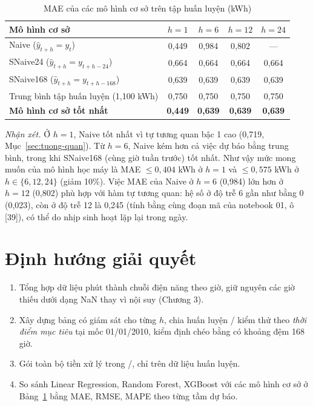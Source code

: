 \documentclass[../main.tex]{subfiles}
\begin{document}
\begin{table}[H]
\centering
\caption{MAE của các mô hình cơ sở trên tập huấn luyện (kWh)}
\label{tab:baseline}
\begin{tabular}{|>{\raggedright\arraybackslash}p{6.2cm}|c|c|c|c|}
\hline
\textbf{Mô hình cơ sở} & $h=1$ & $h=6$ & $h=12$ & $h=24$ \\
\hline
Naive ($\hat{y}_{t+h} = y_t$) & 0,449 & 0,984 & 0,802 & --- \\
\hline
SNaive24 ($\hat{y}_{t+h} = y_{t+h-24}$) & 0,664 & 0,664 & 0,664 & 0,664 \\
\hline
SNaive168 ($\hat{y}_{t+h} = y_{t+h-168}$) & 0,639 & 0,639 & 0,639 & 0,639 \\
\hline
Trung bình tập huấn luyện (1,100 kWh) & 0,750 & 0,750 & 0,750 & 0,750 \\
\hline
\textbf{Mô hình cơ sở tốt nhất} & \textbf{0,449} & \textbf{0,639} & \textbf{0,639} & \textbf{0,639} \\
\hline
\end{tabular}
\end{table}

\noindent\textit{Nhận xét.} Ở $h = 1$, Naive tốt nhất vì tự tương quan bậc 1 cao (0,719, Mục~\ref{sec:tuong-quan}). Từ $h = 6$, Naive kém hơn cả việc dự báo bằng trung bình, trong khi SNaive168 (cùng giờ tuần trước) tốt nhất. Như vậy mức mong muốn của mô hình học máy là MAE $\le 0{,}404$ kWh ở $h = 1$ và $\le 0{,}575$ kWh ở $h \in \{6, 12, 24\}$ (giảm 10\%). Việc MAE của Naive ở $h=6$ (0,984) lớn hơn ở $h=12$ (0,802) phù hợp với hàm tự tương quan: hệ số ở độ trễ 6 gần như bằng 0 (0,023), còn ở độ trễ 12 là 0,245 (tính bằng cùng đoạn mã của notebook 01, ô [39]), có thể do nhịp sinh hoạt lặp lại trong ngày.

\section{Định hướng giải quyết}
\begin{enumerate}[1.]
    \item Tổng hợp dữ liệu phút thành chuỗi điện năng theo giờ, giữ nguyên các giờ thiếu dưới dạng NaN thay vì nội suy (Chương 3).
    \item Xây dựng bảng có giám sát cho từng $h$, chia huấn luyện / kiểm thử theo \textit{thời điểm mục tiêu} tại mốc 01/01/2010, kiểm định chéo bằng  có khoảng đệm 168 giờ.
    \item Gói toàn bộ tiền xử lý trong /, chỉ  trên dữ liệu huấn luyện.
    \item So sánh Linear Regression, Random Forest, XGBoost với các mô hình cơ sở ở Bảng~\ref{tab:baseline} bằng MAE, RMSE, MAPE theo từng tầm dự báo.
\end{enumerate}
\end{document}
